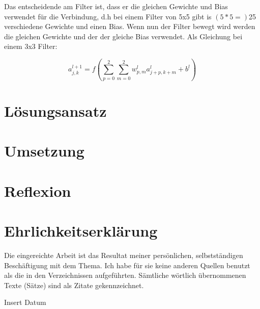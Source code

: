 \documentclass[12pt,a4paper]{report}
\begin{document}
Das entscheidende am Filter ist, dass er die gleichen Gewichte und Bias verwendet für die Verbindung, d.h bei einem
Filter von 5x5 gibt is $(5*5=)$25 verschiedene Gewichte und einen Bias.
Wenn nun der Filter bewegt wird werden die gleichen Gewichte und der der gleiche Bias verwendet.
Als Gleichung bei einem 3x3 Filter:

\[a^{l+1}_{j,k} = f\left(\sum_{p=0}^{2}\sum_{m=0}^{2}w^l_{p,m}a^l_{j+p,k+m} + b^l\right)\]



\chapter{Lösungsansatz}
\label{ch:lösungsansatz}

\chapter{Umsetzung}
\label{ch:umsetzung}

\chapter{Reflexion}
\label{ch:reflexion}

\clearpage
{}
{}
\nocite{*}



\clearpage
{}
{}

\listoffigures

\appendix


\chapter*{Ehrlichkeitserklärung}

Die eingereichte Arbeit ist das Resultat meiner persönlichen, selbstständigen Beschäftigung mit dem Thema.
Ich habe für sie keine anderen Quellen benutzt als die in den Verzeichnissen aufgeführten.
Sämtliche wörtlich übernommenen Texte (Sätze) sind als Zitate gekennzeichnet.

\vspace{2cm}
Insert Datum
\end{document}
